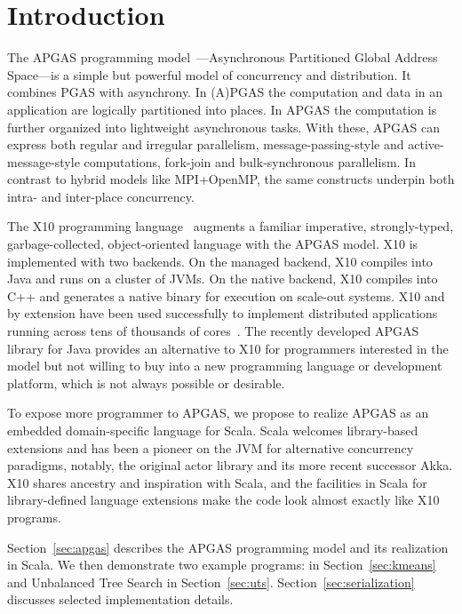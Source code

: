 \section{Introduction}

The APGAS programming model~\cite{amp10}---Asynchronous Partitioned Global Address Space---is a simple but powerful
model of concurrency and distribution. It combines PGAS with asynchrony.
In (A)PGAS the computation and data in an application are logically partitioned into places.
In APGAS the computation is further organized into lightweight asynchronous tasks.
With these, APGAS can express both
regular and irregular parallelism, message-passing-style and
active-message-style computations, fork-join and bulk-synchronous
parallelism.  In contrast to hybrid models like MPI+OpenMP, the same
constructs underpin both intra- and inter-place concurrency.

The X10 programming language~\cite{oopsla05} augments a familiar imperative, strongly-typed, garbage-collected, object-oriented language with the APGAS model. X10 is implemented with two backends. On the managed backend, X10
compiles into Java and runs on a cluster of JVMs. On the native backend, X10 compiles into C++ and generates a native binary
for execution on scale-out systems.
X10 and by extension
\apgas have been used successfully to implement distributed applications
running across tens of thousands of cores~\cite{TardieuETAL14X10ApgasAtPetascale}.
The recently developed APGAS library for Java \cite{APGASJava} provides an alternative to X10 for programmers interested in the \apgas model but not willing to buy into a new programming language or development platform, which is not always possible or desirable.

To expose more programmer to APGAS, we propose to realize APGAS as an embedded domain-specific language for Scala. 
Scala welcomes library-based extensions and has been a pioneer on
the JVM for alternative concurrency paradigms, notably, the original actor
library and its more recent successor Akka.
X10 shares ancestry and inspiration with Scala, and the
facilities in Scala for library-defined language extensions make the code look
almost exactly like X10 programs.

Section~\ref{sec:apgas} describes the APGAS programming model and its realization in Scala. We then demonstrate two example programs: \kmeans in Section~\ref{sec:kmeans} and Unbalanced Tree Search in Section~\ref{sec:uts}. Section~\ref{sec:serialization} discusses selected implementation details.%



